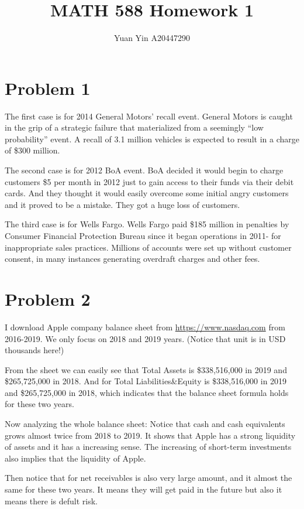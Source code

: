 \documentclass[letterpaper,11pt]{article}
\author{Yuan Yin A20447290}
\title{MATH 588 Homework 1}
\begin{document}
\large
\maketitle
\begin{spacing}{1.2}  %
\section*{Problem 1}
The first case is for 2014 General Motors' recall event. General Motors is caught in the grip of a strategic failure that materialized from a seemingly ``low probability'' event. A recall of 3.1 million vehicles is expected to result in a charge of \$300 million.

The second case is for 2012 BoA event. BoA decided it would begin to charge customers \$5 per month in 2012 just to gain access to their funds via their debit cards. And they thought it would easily overcome some initial angry customers and it proved to be a mistake. They got a huge loss of customers.

The third case is for Wells Fargo. Wells Fargo paid \$185 million in penalties by Consumer Financial Protection Bureau since it began operations in 2011- for inappropriate sales practices. Millions of accounts were set up without customer consent, in many instances generating overdraft charges and other fees.
\section*{Problem 2}
I download Apple company balance sheet from \underline{https://www.nasdaq.com} from 2016-2019. We only focus on 2018 and 2019 years. (Notice that unit is in USD thousands here!)

From the sheet we can easily see that Total Assets is \$338,516,000 in 2019 and \$265,725,000 in 2018. And for Total Liabilities\&Equity is \$338,516,000 in 2019 and \$265,725,000 in 2018, which indicates that the balance sheet formula holds for these two years.

Now analyzing the whole balance sheet: Notice that cash and cash equivalents grows almost twice from 2018 to 2019. It shows that Apple has a strong liquidity of assets and it has a increasing sense. The increasing of short-term investments also implies that the liquidity of Apple.

Then notice that for net receivables is also very large amount, and it almost the same for these two years. It means they will get paid in the future but also it means there is defult risk.


\end{spacing}
\end{document}
